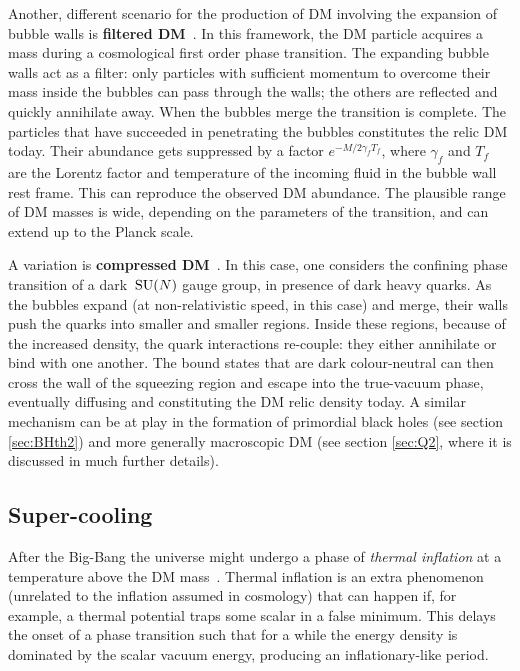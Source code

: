 Another, different scenario for the production of DM involving the expansion of bubble walls is {\bf filtered DM}~\cite{FilteredDM}. In this framework, the DM particle acquires a mass during a cosmological first order phase transition. The expanding bubble walls act as a filter: only particles with sufficient momentum to overcome their mass inside the bubbles can pass through the walls; the others are reflected and quickly annihilate away. When the bubbles merge the transition is complete. The  particles that have succeeded in penetrating the bubbles constitutes the relic DM today. 
Their abundance gets suppressed by a factor 
$e^{-M/2 \gamma_f T_f}$, where $\gamma_f$ and $T_f$ are the Lorentz factor and temperature of the incoming fluid in the bubble wall rest frame.
This  can reproduce the observed DM abundance. 
The plausible range of DM masses is wide, depending on the parameters of the transition, and can extend up to the Planck scale.

A variation is {\bf compressed DM}~\cite{FilteredDM}. 
In this case, one considers the confining phase transition of a dark $\,{\rm SU}(N)$ gauge group, in presence of dark heavy quarks. 
As the bubbles expand (at non-relativistic speed, in this case) and merge, their walls push the quarks into smaller and smaller regions. 
Inside these regions, because of the increased density, the quark interactions re-couple: they either annihilate or bind with one another. 
The bound states that are dark colour-neutral can then cross the wall of the squeezing region and escape into the true-vacuum phase, eventually diffusing and constituting the DM relic density today.
A similar mechanism can be at play in the formation of primordial black holes (see section \ref{sec:BHth2}) and more generally macroscopic DM (see section \ref{sec:Q2}, where it is discussed in much further details).


\subsection{Super-cooling}
\label{supercoolingproduction}
After the Big-Bang the universe might undergo a phase of {\em thermal inflation} 
at a temperature above the DM mass~\cite{Thermal:Inflation,SupercoolDM}. 
Thermal inflation is an extra phenomenon (unrelated to the inflation assumed in cosmology) 
that can happen if, for example, a thermal potential traps some scalar
in a false minimum. This delays the onset of a phase transition such that for a while the energy density is dominated by
the scalar vacuum energy, 
producing an inflationary-like period.

